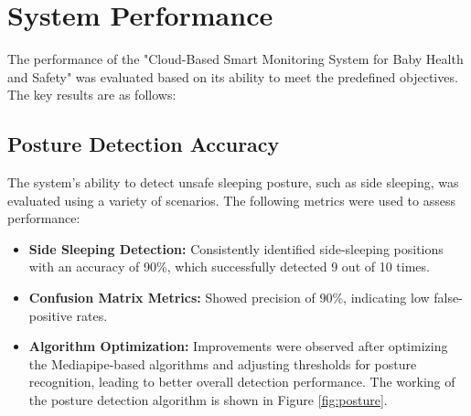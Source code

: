 \documentclass[12pt,a4paper]{report}
\begin{document}
\section{System Performance}
The performance of the "Cloud-Based Smart Monitoring System for Baby Health and Safety" was evaluated based on its ability to meet the predefined objectives. The key results are as follows:

\subsection{Posture Detection Accuracy}
The system's ability to detect unsafe sleeping posture, such as side sleeping, was evaluated using a variety of scenarios. The following metrics were used to assess performance:

\begin{itemize}
    \item \textbf{Side Sleeping Detection:} Consistently identified side-sleeping positions with an accuracy of 90\%, which successfully detected 9 out of 10 times.
    \item \textbf{Confusion Matrix Metrics:} 
    Showed precision of  90\%, indicating low false-positive rates.
    \item \textbf{Algorithm Optimization:} Improvements were observed after optimizing the Mediapipe-based algorithms and adjusting thresholds for posture recognition, leading to better overall detection performance. The working of the posture detection algorithm is shown in Figure \ref{fig:posture}.
\end{itemize}
\end{document}
